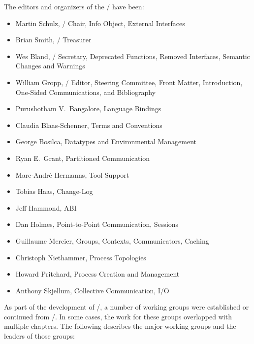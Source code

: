 \noindent The editors and organizers of the \MPIVDOTO/ have been:
\begin{itemize}
\item Martin Schulz, \MPIVDOTO/ Chair, Info Object, External Interfaces
\item Brian Smith, \MPIVDOTO/ Treasurer
\item Wes Bland, \MPIVDOTO/ Secretary, Deprecated Functions, Removed Interfaces, Semantic Changes and Warnings
\item William Gropp, \MPIVDOTO/ Editor, Steering Committee, Front Matter,
      Introduction, One-Sided Communications, and Bibliography

\item Purushotham V.~Bangalore, Language Bindings
\item Claudia Blaas-Schenner, Terms and Conventions
\item George Bosilca, Datatypes and Environmental Management
\item Ryan E.~Grant, Partitioned Communication
\item Marc-Andr\'e Hermanns, Tool Support
\item Tobias Haas, Change-Log
\item Jeff Hammond, ABI
\item Dan Holmes, Point-to-Point Communication, Sessions
\item Guillaume Mercier, Groups, Contexts, Communicators, Caching
\item Christoph Niethammer, Process Topologies
\item Howard Pritchard, Process Creation and Management
\item Anthony Skjellum, Collective Communication, I/O
\end{itemize}

\noindent As part of the development of \MPIVDOTO/, a number of
working groups were established or continued from \MPIIVDOTI/.
In some cases, the work for these groups overlapped with multiple
chapters.
The following describes the major working groups and the leaders of
those groups:

